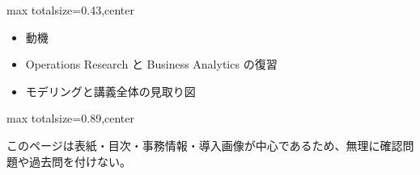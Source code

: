 \clearpage
{}
\begin{minipage}[t]{0.405\textwidth}
\begin{adjustbox}{max totalsize={\textwidth}{0.43\textheight},center}
\begin{minipage}{\textwidth}\scriptsize
{}\begin{itemize}
\item 動機
\item Operations Research と Business Analytics の復習
\item モデリングと講義全体の見取り図
\end{itemize}
\end{minipage}
\end{adjustbox}
\end{minipage}\hfill
\begin{minipage}[t]{0.58\textwidth}
\begin{adjustbox}{max totalsize={\textwidth}{0.89\textheight},center}
\begin{minipage}{\textwidth}\scriptsize
{}このページは表紙・目次・事務情報・導入画像が中心であるため、無理に確認問題や過去問を付けない。
\end{minipage}
\end{adjustbox}
\end{minipage}


